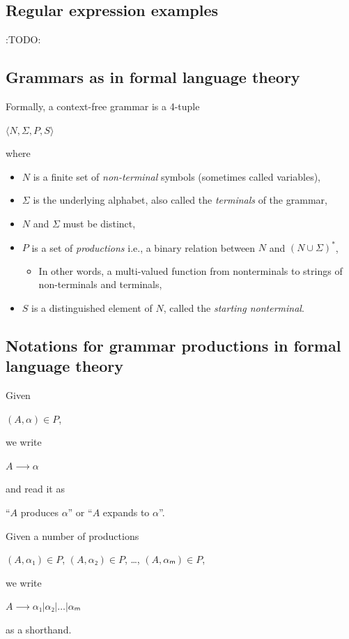 \documentclass[11pt]{article}
\theoremstyle{definition}
\begin{document}
\subsection{Regular expression examples}
\label{sec:org6675e3a}
:TODO:

\subsection{Grammars as in formal language theory}
\label{sec:org2b7da50}
Formally, a context-free grammar is a 4-tuple
\begin{center}
\(⟨N, Σ, P, S⟩\)
\end{center}
where
\begin{itemize}
\item \(N\) is a finite set of \emph{non-terminal} symbols
(sometimes called variables),
\item \(Σ\) is the underlying alphabet,
also called the \emph{terminals} of the grammar,
\item \(N\) and \(Σ\) must be distinct,
\item \(P\) is a set of \emph{productions} i.e.,
a binary relation between \(N\) and \((N ∪ Σ)^{*}\),
\begin{itemize}
\item In other words, a multi-valued function from
nonterminals to strings of non-terminals and terminals,
\end{itemize}
\item \(S\) is a distinguished element of \(N\), called the \emph{starting nonterminal}.
\end{itemize}

\subsection{Notations for grammar productions in formal language theory}
\label{sec:orgb0ada63}
Given
\begin{center}
\((A, α) ∈ P\),
\end{center}
we write
\begin{center}
\(A ⟶ α\)
\end{center}
and read it as
\begin{center}
“\(A\) produces \(α\)” or “\(A\) expands to \(α\)”.
\end{center}

Given a number of
productions
\begin{center}
\((A, α₁) ∈ P\), \((A, α₂) ∈ P\), …, \((A, αₘ) ∈ P\),
\end{center}
we write
\begin{center}
\(A ⟶ α₁ | α₂ | … | αₘ\)
\end{center}
as a shorthand.
\end{document}
